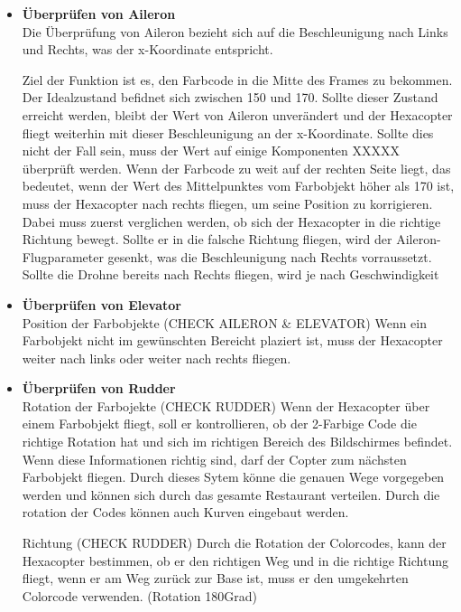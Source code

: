       \begin{itemize}

        \item \textbf{Überprüfen von Aileron}\\
        Die Überprüfung von Aileron bezieht sich auf die Beschleunigung nach Links und Rechts, was der x-Koordinate entspricht.

        Ziel der Funktion ist es, den Farbcode in die Mitte des Frames zu bekommen. Der Idealzustand befidnet sich zwischen 150 und 170.
        Sollte dieser Zustand erreicht werden, bleibt der Wert von Aileron unverändert und der Hexacopter fliegt weiterhin mit dieser Beschleunigung an der
        x-Koordinate.
        Sollte dies nicht der Fall sein, muss der Wert auf einige Komponenten XXXXX überprüft werden.
        Wenn der Farbcode zu weit auf der rechten Seite liegt, das bedeutet, wenn der Wert des Mittelpunktes vom Farbobjekt höher als 170 ist,
        muss der Hexacopter nach rechts fliegen, um seine Position zu korrigieren.
        Dabei muss zuerst verglichen werden, ob sich der Hexacopter in die richtige Richtung bewegt. Sollte er in die falsche Richtung
        fliegen, wird der Aileron-Flugparameter gesenkt, was die Beschleunigung nach Rechts vorraussetzt.
        Sollte die Drohne bereits nach Rechts fliegen, wird je nach Geschwindigkeit





        \item \textbf{Überprüfen von Elevator}\\

        Position der Farbobjekte (CHECK AILERON \& ELEVATOR)
        Wenn ein Farbobjekt nicht im gewünschten Bereicht plaziert ist, muss der Hexacopter weiter nach links oder weiter nach rechts fliegen.

        \item \textbf{Überprüfen von Rudder}\\

        Rotation der Farbojekte (CHECK RUDDER)
        Wenn der Hexacopter über einem Farbobjekt fliegt, soll er kontrollieren, ob der 2-Farbige Code die richtige Rotation hat und sich im richtigen Bereich des Bildschirmes befindet. Wenn diese Informationen richtig sind, darf der Copter zum nächsten Farbobjekt fliegen.
        Durch dieses Sytem könne die genauen Wege vorgegeben werden und können sich durch das gesamte Restaurant verteilen. Durch die rotation der Codes können auch Kurven eingebaut werden.



        Richtung (CHECK RUDDER)
        Durch die Rotation der Colorcodes, kann der Hexacopter bestimmen, ob er den richtigen Weg und in die richtige Richtung fliegt, wenn er am Weg zurück zur Base ist, muss er den umgekehrten Colorcode verwenden. (Rotation 180Grad)





      \end{itemize}









